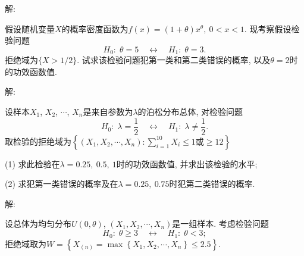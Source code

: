 \documentclass[standard]{ExBook}
\begin{document}
\begin{qitems}
\vspace{-5em}

    \begin{bbox}
解: 
    \end{bbox}

\vspace{-5em}

    \begin{bbox} 
    \begin{shaded}
        \qitem
假设随机变量$X$的概率密度函数为$f(x) = (1 + \theta)x^{\theta},\ 0 < x < 1$. 现考察假设检验问题
\[
H_0: \; \theta = 5 \quad \longleftrightarrow \quad H_1: \; \theta = 3.
\]
拒绝域为$\{X > 1/2\}$. 试求该检验问题犯第一类和第二类错误的概率, 以及$\theta = 2$时的功效函数值.
    \end{shaded}
    \end{bbox}

\vspace{-5em}

    \begin{bbox}
解: 
    \end{bbox}

\vspace{-5em}

    \begin{bbox} 
    \begin{shaded}
        \qitem
设样本$X_1$, $X_2$, $\cdots$, $X_n$是来自参数为$\lambda$的泊松分布总体, 对检验问题
\[
H_0: \; \lambda = \displaystyle\frac{1}{2} \quad \longleftrightarrow \quad H_1: \; \lambda \neq \displaystyle\frac{1}{2}.
\]
取检验的拒绝域为$\left\{\left(X_1,X_2,\cdots,X_n\right): \displaystyle\sum\limits_{i=1}^{10}X_{i} \leq 1 \text{或} \geq 12\right\}$

(1) 求此检验在$\lambda=0.25,\ 0.5,\ 1$时的功效函数值, 并求出该检验的水平;

(2) 求犯第一类错误的概率及在$\lambda=0.25,\ 0.75$时犯第二类错误的概率.
    \end{shaded}
    \end{bbox}

\vspace{-5em}

    \begin{bbox}
解: 
    \end{bbox}

\vspace{-5em}

    \begin{bbox} 
    \begin{shaded}
        \qitem
设总体为均匀分布$U(0, \theta)$, $\left(X_1,X_2,\cdots, X_n\right)$是一组样本. 考虑检验问题
\[
H_0: \; \theta \ge 3 \quad \longleftrightarrow \quad H_1: \; \theta < 3;
\]
拒绝域取为$W = \left\{X_{(n)} = \max\left\{X_1,X_2,\cdots,X_n\right\} \leq 2.5\right\}$.


\end{shaded}
\end{bbox}
\end{qitems}
\end{document}
